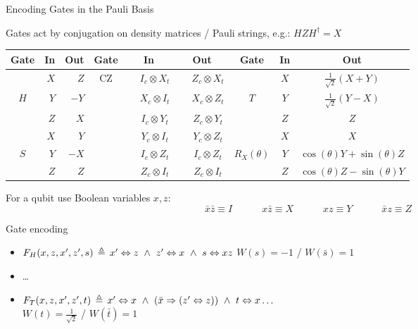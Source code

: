 \begin{frame}{Encoding Gates in the Pauli Basis}
	

Gates act by conjugation on density matrices / Pauli strings, e.g.: $H Z H^\dagger = X$

\pause

  \setlength{\tabcolsep}{3pt} 
  \begin{tabular}{c|rr||c|cc||c|cc}
      \toprule
      \textbf{Gate} & \textbf{In} & \textbf{Out} & \textbf{Gate} & \textbf{In} & \textbf{Out} & \textbf{Gate} & \textbf{In} & \textbf{Out} \\
      \midrule
      & $X$ & $Z$ & \multirow{6}{*}{CZ} & $\phantom{-}I_c \otimes X_t$ & $\phantom{-}Z_c\otimes X_t$ && $X$& $\frac1{\sqrt2}(X+Y)$ \\
      $H$ & $Y$ & $-Y$ & & $\phantom{-}X_c \otimes I_t$ & $\phantom{-}X_c \otimes Z_t$ & $T$ & $Y$ & $\frac1{\sqrt2}(Y - X)$ \\
      & $Z$ & $X$ & & $\phantom{-}I_c \otimes Y_t$ & $\phantom{-}Z_c \otimes Y_t$   &&$Z$ & $Z$ \\
      \cline{1-3} \cline{7-9}
       & $X$ & $Y$ & & $\phantom{-}Y_c \otimes I_t$ & $\phantom{-}Y_c \otimes Z_t$  &&$X$& $X$  \\
      $S$ & $Y$ & $-X$ & & $\phantom{-}I_c \otimes Z_t$ & $\phantom{-}I_c \otimes Z_t$  &$R_X(\theta)$& $Y$& $\cos(\theta)Y + \sin(\theta) Z$ \\
      & $Z$ & $Z$ & & $\phantom{-}Z_c \otimes I_t$ & $\phantom{-}Z_c \otimes I_t$ && $Z$& $\cos(\theta)Z - \sin(\theta) Y$\\
      \bottomrule
  \end{tabular}

\pause
{}




For a qubit use Boolean variables $x,z$:\\
\[
\bar x \bar z \equiv I \quad\quad\quad  x \bar z \equiv X  \quad\quad\quad x  z \equiv Y \quad\quad\quad \bar x  z \equiv Z
\]


\pause

\begin{block}{Gate encoding}
    \begin{itemize}
      \item $F_{H}(x, z, x', z', s) \,\triangleq\, x' \Leftrightarrow z ~\land~ z' \Leftrightarrow x ~\land~ s \Leftrightarrow xz $ \hfill  $W(s) = -1$ / $W(\bar s) = 1$
      \item \dots %
\pause
      \item $F_{T}(x, z, x', z', t) \,\triangleq\, x' \Leftrightarrow  x ~\land~  (\bar x \Rightarrow (z' \Leftrightarrow  z)) ~\land~  t \Leftrightarrow  x \dots$ \\
		\hfill  $W(t) = \tfrac1{\sqrt 2}$ / $W(\bar t) = 1$
    \end{itemize}
\end{block}


  
	
\end{frame}




